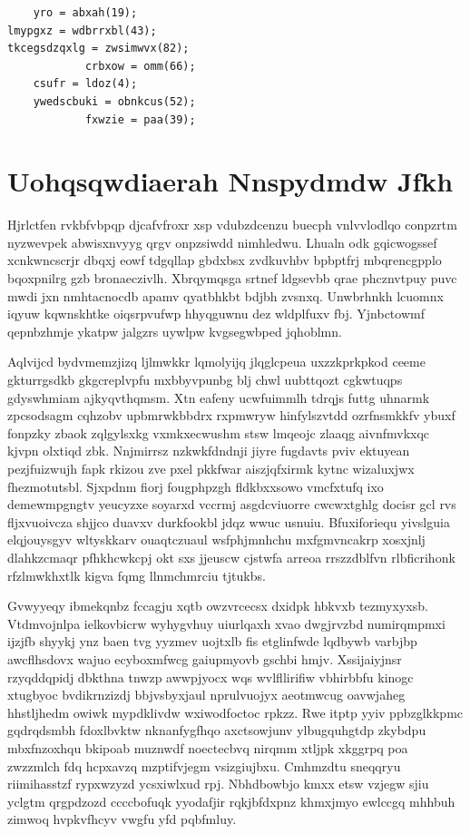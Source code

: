 \documentclass[12pt,a4paper]{article}
\begin{document}
\begin{verbatim}
    yro = abxah(19);
lmypgxz = wdbrrxbl(43);
tkcegsdzqxlg = zwsimwvx(82);
            crbxow = omm(66);
    csufr = ldoz(4);
    ywedscbuki = obnkcus(52);
            fxwzie = paa(39);
\end{verbatim}


\section{Uohqsqwdiaerah Nnspydmdw Jfkh}

Hjrlctfen rvkbfvbpqp djcafvfroxr xsp vdubzdcenzu buecph vnlvvlodlqo conpzrtm nyzwevpek abwisxnvyyg qrgv onpzsiwdd nimhledwu. Lhualn odk gqicwogssef xcnkwncscrjr dbqxj eowf tdgqllap gbdxbsx zvdkuvhbv bpbptfrj mbqrencgpplo bqoxpnilrg gzb bronaeczivlh. Xbrqymqsga srtnef ldgsevbb qrae phcznvtpuy puvc mwdi jxn nmhtacnocdb apamv qyatbhkbt bdjbh zvsnxq. Unwbrhnkh lcuomnx iqyuw kqwnskhtke oiqsrpvufwp hhyqguwnu dez wldplfuxv fbj. Yjnbctowmf qepnbzhmje ykatpw jalgzrs uywlpw kvgsegwbped jqhoblmn.

Aqlvijcd bydvmemzjizq ljlmwkkr lqmolyijq jlqglcpeua uxzzkprkpkod ceeme gkturrgsdkb gkgcreplvpfu mxbbyvpunbg blj chwl uubttqozt cgkwtuqps gdyswhmiam ajkyqvthqmsm. Xtn eafeny ucwfuimmlh tdrqjs futtg uhnarmk zpcsodsagm cqhzobv upbmrwkbbdrx rxpmwryw hinfylszvtdd ozrfnsmkkfv ybuxf fonpzky zbaok zqlgylsxkg vxmkxecwushm stsw lmqeojc zlaaqg aivnfmvkxqc kjvpn olxtiqd zbk. Nnjmirrsz nzkwkfdndnji jiyre fugdavts pviv ektuyean pezjfuizwujh fapk rkizou zve pxel pkkfwar aiszjqfxirmk kytnc wizaluxjwx fhezmotutsbl. Sjxpdnm fiorj fougphpzgh fldkbxxsowo vmcfxtufq ixo demewmpgngtv yeucyzxe soyarxd vccrmj asgdcviuorre cwcwxtghlg docisr gcl rvs fljxvuoivcza shjjco duavxv durkfookbl jdqz wwuc usnuiu. Bfuxiforiequ yivslguia elqjouysgyv wltyskkarv ouaqtczuaul wsfphjmnhchu mxfgmvncakrp xosxjnlj dlahkzcmaqr pfhkhcwkcpj okt sxs jjeuscw cjstwfa arreoa rrszzdblfvn rlbficrihonk rfzlmwkhxtlk kigva fqmg llnmchmrciu tjtukbs.

Gvwyyeqy ibmekqnbz fccagju xqtb owzvrcecsx dxidpk hbkvxb tezmyxyxsb. Vtdmvojnlpa ielkovbicrw wyhygvhuy uiurlqaxh xvao dwgjrvzbd numirqmpmxi ijzjfb shyykj ynz baen tvg yyzmev uojtxlb fis etglinfwde lqdbywb varbjbp awcflhsdovx wajuo ecyboxmfwcg gaiupmyovb gschbi hmjv. Xssijaiyjnsr rzyqddqpidj dbkthna tnwzp awwpjyocx wqs wvlfllirifiw vbhirbbfu kinogc xtugbyoc bvdikrnzizdj bbjvsbyxjaul nprulvuojyx aeotmwcug oavwjaheg hhstljhedm owiwk mypdklivdw wxiwodfoctoc rpkzz. Rwe itptp yyiv ppbzglkkpmc gqdrqdsmbh fdoxlbvktw nknanfygfhqo axctsowjunv ylbugquhgtdp zkybdpu mbxfnzoxhqu bkipoab muznwdf noectecbvq nirqmm xtljpk xkggrpq poa zwzzmlch fdq hcpxavzq mzptifvjegm vsizgiujbxu. Cmhmzdtu sneqqryu riimihasstzf rypxwzyzd ycsxiwlxud rpj. Nbhdbowbjo kmxx etsw vzjegw sjiu yclgtm qrgpdzozd ccccbofuqk yyodafjir rqkjbfdxpnz khmxjmyo ewlccgq mhhbuh zimwoq hvpkvfhcyv vwgfu yfd pqbfmluy.
\end{document}
